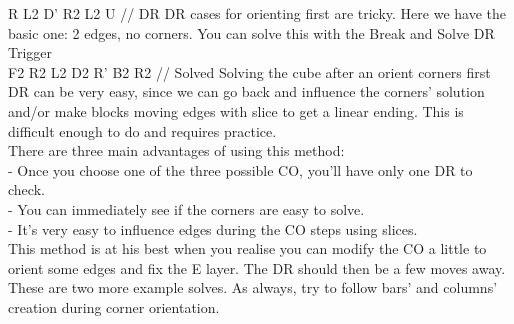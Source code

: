 \documentclass[11pt,a4paper]{book}
\newcommand{\comment}[1]{{\color{gray}\quad//#1}}
\begin{document}
\newline
R L2 D' R2 L2 U \comment{ DR}
\newline
DR cases for orienting first are tricky. Here we have the basic one: 2 edges, no corners. You can solve this with the Break and Solve DR Trigger\\
\newline
F2 R2 L2 D2 R' B2 R2 \comment{ Solved }
\newline
Solving the cube after an orient corners first DR can be very easy, since we can go back and influence the corners’ solution and/or make blocks  moving edges with slice to get a linear ending. This is difficult enough to do and requires practice.\\
\newline
There are three main advantages of using this method:\\
\newline
- Once you choose one of the three possible CO, you’ll have only one DR to check.\\
- You can immediately see if the corners are easy to solve.\\
- It’s very easy to influence edges during the CO steps using slices.\\
\newline
This method is at his best when you realise you can modify the CO a little to orient some edges and fix the E layer. The DR should then be a few moves away.\\
\hfill \break
These are two more example solves. As always, try to follow bars’ and columns’ creation during corner orientation. \\
\end{document}
